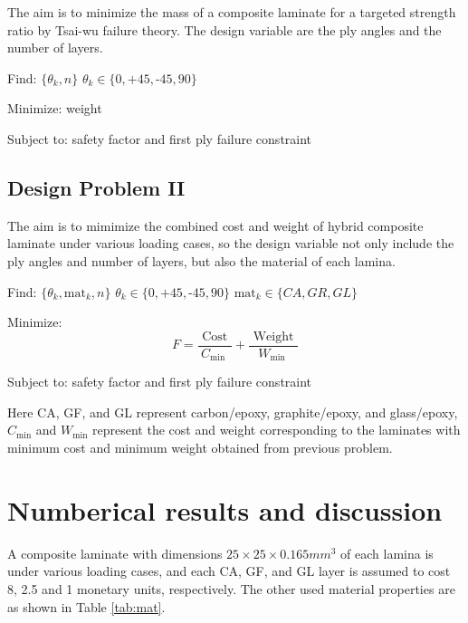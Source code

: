 \documentclass[smallextended]{svjour3}       %
\begin{document}
The aim is to minimize the mass of a composite laminate for a targeted strength
ratio by Tsai-wu failure theory. The design variable are the ply angles and the
number of layers.

Find: $\{\theta_k, n\}$ $\theta_k \in \{ 0,\text{+}45,\text{-}45,90\}$ 

Minimize: weight

Subject to: safety factor and first ply failure constraint


\subsection{Design Problem II}
The aim is to mimimize the combined cost and weight of hybrid composite
laminate under various loading cases, so the design variable not only include
the ply angles and number of layers, but also the material of each lamina. 


Find: $\{\theta_k,\text{mat}_k, n\}$ $\theta_k \in \{ 0,\text{+}45,\text{-}45,90\}$ $\text{mat}_k \in \{CA, GR, GL \}$

Minimize: 
\begin{equation}
	F=\frac{\text { Cost }}{C_{\text {min }}}+\frac{\text { Weight }}{W_{\text {min }}}
\end{equation}

Subject to: safety factor and first ply failure constraint


Here CA, GF, and GL represent carbon/epoxy, graphite/epoxy, and glass/epoxy,
 $C_{\text{min}}$ and $W_{\text{min}}$ represent the cost and
weight corresponding to the laminates with minimum cost and minimum weight
obtained from previous problem.


\section{Numberical results and discussion}
A composite laminate with dimensions $25 \times 25 \times 0.165 mm^3$ of each lamina is under various
loading cases, and each CA, GF, and GL layer is assumed to cost 8, 2.5 and 1 monetary units,
respectively.  The other used material properties are as shown in Table
\ref{tab:mat}.  
\end{document}
